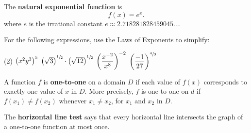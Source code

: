 \documentclass[mathNotesPreamble]{subfiles}
\begin{document}
  \begin{defn*}
    The \textbf{natural exponential function} is 
      \[f(x)=e^x.\]
    where $e$ is the irrational constant $e\approx2.718281828459045\dots$.
  \end{defn*}
  \pagebreak
  
  \noindent
  \begin{ex*}
    For the following expressions, use the Laws of Exponents to simplify:
  \end{ex*}
  \begin{tasks}[after-item-skip=\stretch{1}](2)
    \task $\parens{x^2y^3}^5$
    \task $\parens{\sqrt 3}^{\sfrac{1}{2}}\cdot\parens{\sqrt{12}}^{\sfrac{1}{2}}$
    \task $\parens{\dfrac{x\inv[2]}{x^8}}\inv[2]$
    \task $\parens{\dfrac{-1}{27}}^{\sfrac{4}{3}}$
  \end{tasks}
  \pagebreak
  
  \begin{defn*}
  
    A function $f$ is \textbf{one-to-one} on a domain $D$ if each value of $f(x)$ corresponds to exactly one value of $x$ in $D$. More precisely, $f$ is one-to-one on $d$ if $f(x_1)\neq f(x_2)$ whenever $x_1\neq x_2$, for $x_1$ and $x_2$ in $D$. 
    
    The \textbf{horizontal line test} says that every horizontal line intersects the graph of a one-to-one function at most once.
  \end{defn*}
  
\end{document}
